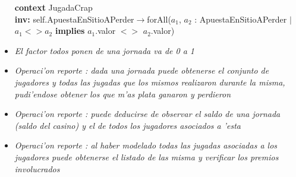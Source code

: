 \begin{itemize}
\textbf{context}  JugadaCrap \\ \textbf{inv:} 
  self.ApuestaEnSitioAPerder$\rightarrow$forAll($a_{1}$, $a_{2}$ : ApuestaEnSitioAPerder  $ | $ $a_{1} <> a_{2} $ \textbf{implies} $a_{1}$.valor $<>$ $a_{2}$.valor)


\item\textit{El factor todos ponen de una jornada va de 0 a 1}

\item\textit{Operaci'on reporte : dada una jornada puede obtenerse el conjunto de jugadores y todas las jugadas que los mismos realizaron durante la misma, pudi'endose obtener los que m'as plata ganaron y perdieron }

\item\textit{Operaci'on reporte : puede deducirse de observar el saldo de una jornada (saldo del casino) y el de todos los jugadores asociados a 'esta }

\item\textit{Operaci'on reporte : al haber modelado todas las jugadas asociadas a los jugadores puede obtenerse el listado de las misma y verificar los premios involucrados }

\end{itemize}
